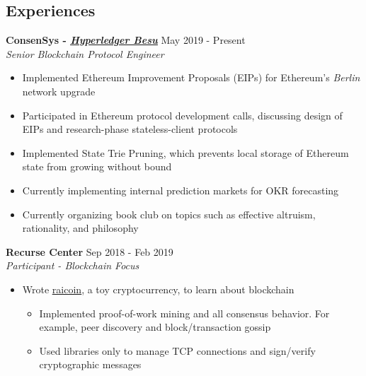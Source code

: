 \documentclass[overlapped]{res}
\begin{document}

\address{\href{rai.dev}{\underline{rai.dev}} \\ \href{https://www.github.com/ratanrsur}{\underline{github.com/ratanrsur}}}
\address{\href{mailto:ratan.r.sur@gmail.com}{\underline{ratan.r.sur@gmail.com}} \\ \hfill +1 646 410 6411\\\hfill{}US Citizen}
\begin{resume}


    \section{Experiences}

    {\bf ConsenSys - \href{https://www.github.com/Hyperledger/Besu}{\underline{\em Hyperledger Besu}}} \hfill May 2019 - Present \\
    {\em Senior Blockchain Protocol Engineer\/}
    \begin{itemize} \itemsep-2pt
        \item Implemented Ethereum Improvement Proposals (EIPs) for Ethereum's {\em Berlin} network upgrade
        \item
            Participated in Ethereum protocol development calls, discussing design of EIPs and research-phase stateless-client protocols
        \item
          Implemented State Trie Pruning, which prevents local storage of Ethereum state from growing without bound
        \item Currently implementing internal prediction markets for OKR forecasting
        \item Currently organizing book club on topics such as effective altruism, rationality, and philosophy
    \end{itemize}

    {\bf Recurse Center} \hfill Sep 2018 - Feb 2019 \\
    {\em Participant\/ - Blockchain Focus}
    \begin{itemize} \itemsep-2pt
        \item
          Wrote \href{https://www.github.com/ratanrsur/raicoin}{\underline{raicoin}}, a toy cryptocurrency, to learn about blockchain
        \begin{itemize} \itemsep-2pt
          \item
            Implemented proof-of-work mining and all consensus behavior. For example, peer discovery and block/transaction gossip
          \item Used libraries only to manage TCP connections and sign/verify cryptographic messages
        \end{itemize}


\end{itemize}
\end{resume}
\end{document}
